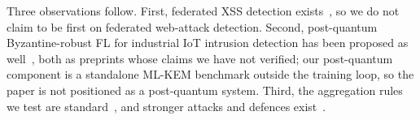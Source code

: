 Three observations follow. First, federated XSS detection exists~\cite{jazi2024fedxss,wang2025fedxss,bharath2026fedxssguard}, so we do not claim to be first on federated web-attack detection. Second, post-quantum Byzantine-robust FL for industrial IoT intrusion detection has been proposed as well~\cite{rahmati2026pqbyz,nayak2026pqfl}, both as preprints whose claims we have not verified; our post-quantum component is a standalone ML-KEM benchmark outside the training loop, so the paper is not positioned as a post-quantum system. Third, the aggregation rules we test are standard~\cite{yin2018,blanchard2017}, and stronger attacks and defences exist~\cite{baruch2019alie,fang2020,cao2021fltrust,elmhamdi2018bulyan}.
